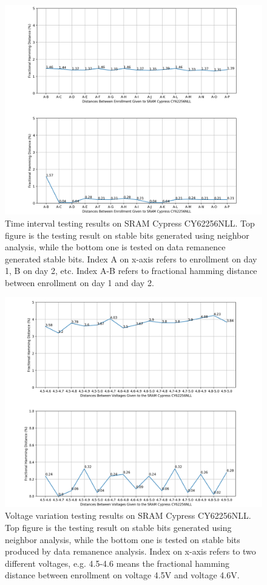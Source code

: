 \begin{figure}[tph!]
    \centerline{\includegraphics[width={1.2\textwidth}]{images/cy62256nll_hd_intra_time_stable}}
    \caption{Time interval testing results on SRAM Cypress CY62256NLL. Top figure is the testing result on stable bits generated using neighbor analysis, while the bottom one is tested on data remanence generated stable bits. Index A on x-axis refers to enrollment on day 1, B on day 2, etc. Index A-B refers to fractional hamming distance between enrollment on day 1 and day 2.}
    \label{fig:test_stable_cy62256nll}
\end{figure}

\begin{figure}[tph!]
    \centerline{\includegraphics[width={1.2\textwidth}]{images/cy62256nll_hd_intra_voltage_stable}}
    \caption{Voltage variation testing results on SRAM Cypress CY62256NLL. Top figure is the testing result on stable bits generated using neighbor analysis, while the bottom one is tested on stable bits produced by data remanence analysis. Index on x-axis refers to two different voltages, e.g. 4.5-4.6 means the fractional hamming distance between enrollment on voltage 4.5V and voltage 4.6V.}
    \label{fig:test_stable_cy62256nll_voltage}
\end{figure}

